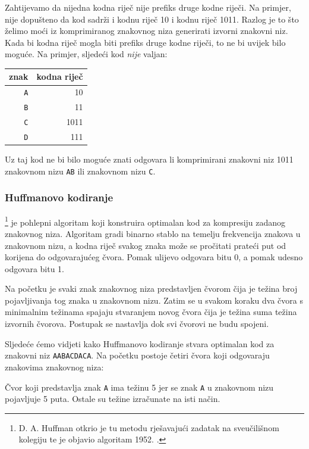 Zahtijevamo da nijedna kodna riječ
nije prefiks druge kodne riječi.
Na primjer, nije dopušteno da kod
sadrži i kodnu riječ 10
i kodnu riječ 1011.
Razlog je to što želimo
moći iz komprimiranog znakovnog niza
generirati izvorni znakovni niz.
Kada bi kodna riječ mogla biti prefiks druge kodne riječi,
to ne bi uvijek bilo moguće.
Na primjer, sljedeći kod \emph{nije} valjan:
\begin{center}
\begin{tabular}{rr}
znak & kodna riječ \\
\hline
\texttt{A} & 10 \\
\texttt{B} & 11 \\
\texttt{C} & 1011 \\
\texttt{D} & 111 \\
\end{tabular}
\end{center}
Uz taj kod ne bi bilo moguće znati
odgovara li komprimirani znakovni niz 1011
znakovnom nizu \texttt{AB} ili znakovnom nizu \texttt{C}.


\subsubsection{Huffmanovo kodiranje}

\footnote{D. A. Huffman otkrio je tu metodu
rješavajući zadatak na sveučilišnom kolegiju
te je objavio algoritam 1952. \cite{huf52}.} je pohlepni algoritam
koji konstruira optimalan kod za
kompresiju zadanog znakovnog niza.
Algoritam gradi binarno stablo
na temelju frekvencija znakova
u znakovnom nizu,
a kodna riječ svakog znaka može se pročitati
prateći put od korijena do
odgovarajućeg čvora.
Pomak ulijevo odgovara bitu 0,
a pomak udesno odgovara bitu 1.

Na početku je svaki znak znakovnog niza
predstavljen čvorom čija je težina
broj pojavljivanja tog znaka u znakovnom nizu.
Zatim se u svakom koraku dva čvora s minimalnim težinama
spajaju stvaranjem
novog čvora čija je težina suma težina
izvornih čvorova.
Postupak se nastavlja dok svi čvorovi ne budu spojeni.

Sljedeće ćemo vidjeti kako Huffmanovo kodiranje stvara
optimalan kod za znakovni niz
\texttt{AABACDACA}.
Na početku postoje četiri čvora koji odgovaraju
znakovima znakovnog niza:

\begin{center}
\end{center}
Čvor koji predstavlja znak \texttt{A}
ima težinu 5 jer se znak \texttt{A}
u znakovnom nizu pojavljuje 5 puta.
Ostale su težine izračunate
na isti način.

